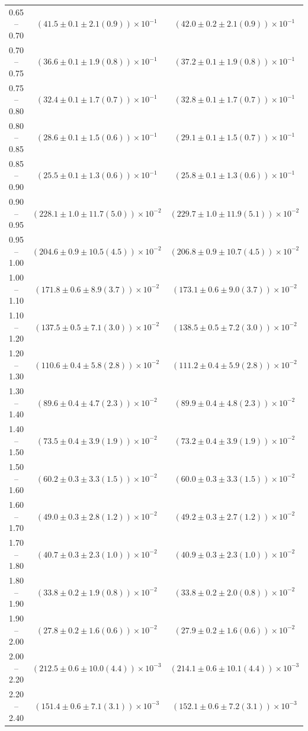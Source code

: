 \begin{table}
\begin{center}
\begin{tabular}{ c | c c }
0.65 -- 0.70 & $(41.5\pm0.1\pm2.1(0.9))\times10^{-1}$ & $(42.0\pm0.2\pm2.1(0.9))\times10^{-1}$ \\ 
0.70 -- 0.75 & $(36.6\pm0.1\pm1.9(0.8))\times10^{-1}$ & $(37.2\pm0.1\pm1.9(0.8))\times10^{-1}$ \\ 
0.75 -- 0.80 & $(32.4\pm0.1\pm1.7(0.7))\times10^{-1}$ & $(32.8\pm0.1\pm1.7(0.7))\times10^{-1}$ \\ 
0.80 -- 0.85 & $(28.6\pm0.1\pm1.5(0.6))\times10^{-1}$ & $(29.1\pm0.1\pm1.5(0.7))\times10^{-1}$ \\ 
0.85 -- 0.90 & $(25.5\pm0.1\pm1.3(0.6))\times10^{-1}$ & $(25.8\pm0.1\pm1.3(0.6))\times10^{-1}$ \\ 
0.90 -- 0.95 & $(228.1\pm1.0\pm11.7(5.0))\times10^{-2}$ & $(229.7\pm1.0\pm11.9(5.1))\times10^{-2}$ \\ 
0.95 -- 1.00 & $(204.6\pm0.9\pm10.5(4.5))\times10^{-2}$ & $(206.8\pm0.9\pm10.7(4.5))\times10^{-2}$ \\ 
1.00 -- 1.10 & $(171.8\pm0.6\pm8.9(3.7))\times10^{-2}$ & $(173.1\pm0.6\pm9.0(3.7))\times10^{-2}$ \\ 
1.10 -- 1.20 & $(137.5\pm0.5\pm7.1(3.0))\times10^{-2}$ & $(138.5\pm0.5\pm7.2(3.0))\times10^{-2}$ \\ 
1.20 -- 1.30 & $(110.6\pm0.4\pm5.8(2.8))\times10^{-2}$ & $(111.2\pm0.4\pm5.9(2.8))\times10^{-2}$ \\ 
1.30 -- 1.40 & $(89.6\pm0.4\pm4.7(2.3))\times10^{-2}$ & $(89.9\pm0.4\pm4.8(2.3))\times10^{-2}$ \\ 
1.40 -- 1.50 & $(73.5\pm0.4\pm3.9(1.9))\times10^{-2}$ & $(73.2\pm0.4\pm3.9(1.9))\times10^{-2}$ \\ 
1.50 -- 1.60 & $(60.2\pm0.3\pm3.3(1.5))\times10^{-2}$ & $(60.0\pm0.3\pm3.3(1.5))\times10^{-2}$ \\ 
1.60 -- 1.70 & $(49.0\pm0.3\pm2.8(1.2))\times10^{-2}$ & $(49.2\pm0.3\pm2.7(1.2))\times10^{-2}$ \\ 
1.70 -- 1.80 & $(40.7\pm0.3\pm2.3(1.0))\times10^{-2}$ & $(40.9\pm0.3\pm2.3(1.0))\times10^{-2}$ \\ 
1.80 -- 1.90 & $(33.8\pm0.2\pm1.9(0.8))\times10^{-2}$ & $(33.8\pm0.2\pm2.0(0.8))\times10^{-2}$ \\ 
1.90 -- 2.00 & $(27.8\pm0.2\pm1.6(0.6))\times10^{-2}$ & $(27.9\pm0.2\pm1.6(0.6))\times10^{-2}$ \\ 
2.00 -- 2.20 & $(212.5\pm0.6\pm10.0(4.4))\times10^{-3}$ & $(214.1\pm0.6\pm10.1(4.4))\times10^{-3}$ \\ 
2.20 -- 2.40 & $(151.4\pm0.6\pm7.1(3.1))\times10^{-3}$ & $(152.1\pm0.6\pm7.2(3.1))\times10^{-3}$ \\ 

\end{tabular}
\end{center}
\end{table}
